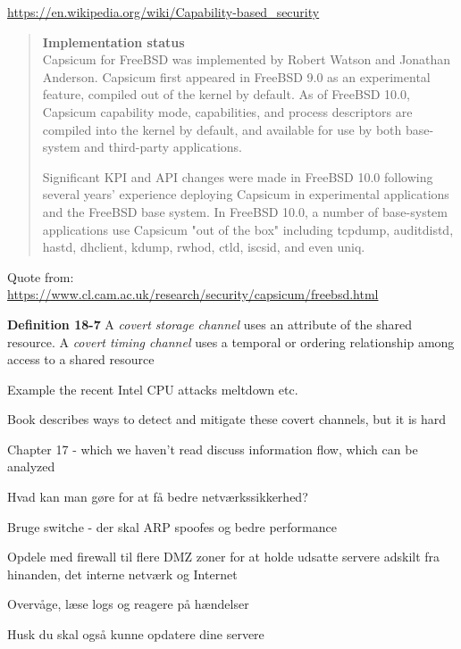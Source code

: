 \documentclass[Screen16to9,17pt]{foils}
\begin{document}
\url{https://en.wikipedia.org/wiki/Capability-based_security}


\begin{quote}{\bf
Implementation status}\\
Capsicum for FreeBSD was implemented by Robert Watson and Jonathan Anderson. Capsicum first appeared in FreeBSD 9.0 as an experimental feature, compiled out of the kernel by default. As of FreeBSD 10.0, Capsicum capability mode, capabilities, and process descriptors are compiled into the kernel by default, and available for use by both base-system and third-party applications.

Significant KPI and API changes were made in FreeBSD 10.0 following several years' experience deploying Capsicum in experimental applications and the FreeBSD base system. In FreeBSD 10.0, a number of base-system applications use Capsicum "out of the box" including tcpdump, auditdistd, hastd, dhclient, kdump, rwhod, ctld, iscsid, and even uniq.
\end{quote}

Quote from:\\
\url{https://www.cl.cam.ac.uk/research/security/capsicum/freebsd.html}



\begin{list1}
\item {\bf Definition 18-7} A \emph{covert storage channel} uses an attribute of the shared resource. A \emph{covert timing channel} uses a temporal or ordering relationship among access to a shared resource
\item Example the recent Intel CPU attacks meltdown etc.
\item Book describes ways to detect and mitigate these covert channels, but it is hard
\item Chapter 17 - which we haven't read discuss information flow, which can be analyzed
\end{list1}






\begin{list1}
\item Hvad kan man gøre for at få bedre netværkssikkerhed?
\begin{list2}
\item Bruge switche - der skal ARP spoofes og bedre performance
\item Opdele med firewall til flere DMZ zoner for at holde
      udsatte servere adskilt fra hinanden, det interne netværk og
      Internet
\item Overvåge, læse logs og reagere på hændelser
\end{list2}
\item Husk du skal også kunne opdatere dine servere
\end{list1}
\end{document}
